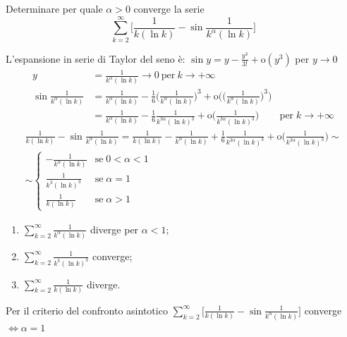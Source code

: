 \begin{exbar}
	\begin{example}
		Determinare per quale $\alpha>0$ converge la serie 
		\begin{equation*}
			\sum_{k=2}^\infty \bigg[\frac{1}{k(\ln k)} - \sin \frac{1}{k^\alpha(\ln k)} \bigg]
		\end{equation*}
		
		L'espansione in serie di Taylor del seno è: $\sin y = y - \frac{y^3}{3!} + \mathrm{o}(y^3)$ per $y\rightarrow0$
		\begin{align*}
			y &= \frac{1}{k^\alpha(\ln k)} \rightarrow 0 \ \text{per} \ k\rightarrow+\infty
			\\
			\sin \frac{1}{k^\alpha (\ln k)}
			&= \frac{1}{k^\alpha (\ln k)} - \frac{1}{6} \bigg(\frac{1}{k^\alpha (\ln k)} \bigg)^3 + \mathrm{o}\bigg( \bigg(\frac{1}{k^\alpha (\ln k)} \bigg)^3 \bigg) 
			\\
			&= \frac{1}{k^\alpha (\ln k)} - \frac{1}{6} \frac{1}{k^{3\alpha}(\ln k)^3} + \mathrm{o}\bigg(\frac{1}{k^{3\alpha}(\ln k)^3} \bigg) & \mathrm{per} \; k \rightarrow + \infty
		\end{align*}
		\begin{gather*}
		\frac{1}{k (\ln k)} - \sin\frac{1}{k^\alpha(\ln k)} = \frac{1}{k (\ln k)} -\frac{1}{k^\alpha (\ln k)} + \frac{1}{6} \frac{1}{k^{3\alpha}(\ln k)^3} + \mathrm{o}\bigg(\frac{1}{k^{3\alpha}(\ln k)^3} \bigg) \sim
		\\
		\sim \begin{cases}
				-\frac{1}{k^\alpha (\ln k)} & \mathrm{se} \; 0<\alpha<1 
				\\[1em]
				\frac{1}{k^3(\ln k)^3} & \mathrm{se} \; \alpha = 1 
				\\[1em]
				\frac{1}{k (\ln k)} & \mathrm{se} \; \alpha > 1
			\end{cases}
		\end{gather*}
		
		\begin{enumerate}
			\item $\sum_{k=2}^\infty \frac{1}{k^\alpha (\ln k)}$ diverge per $\alpha < 1$;
			\item $\sum_{k=2}^\infty \frac{1}{k^3 (\ln k)^3}$ converge;
			\item $\sum_{k=2}^\infty \frac{1}{k (\ln k)}$ diverge.
		\end{enumerate}
		
		Per il criterio del confronto asintotico
		$\sum_{k=2}^\infty \bigg[\frac{1}{k (\ln k)} - \sin \frac{1}{k^\alpha (\ln k)} \bigg]$ converge $\iff \alpha=1$
	\end{example}
\end{exbar}

